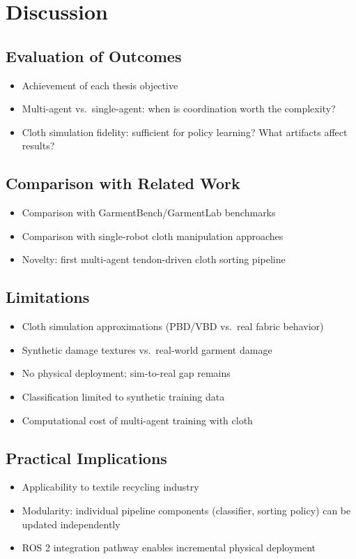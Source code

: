 \chapter{Discussion}\label{ch:discussion}

\section{Evaluation of Outcomes}
\begin{itemize}
    \item Achievement of each thesis objective
    \item Multi-agent vs.\ single-agent: when is coordination worth the complexity?
    \item Cloth simulation fidelity: sufficient for policy learning? What artifacts affect results?
\end{itemize}

\section{Comparison with Related Work}
\begin{itemize}
    \item Comparison with GarmentBench/GarmentLab benchmarks
    \item Comparison with single-robot cloth manipulation approaches
    \item Novelty: first multi-agent tendon-driven cloth sorting pipeline
\end{itemize}

\section{Limitations}
\begin{itemize}
    \item Cloth simulation approximations (PBD/VBD vs.\ real fabric behavior)
    \item Synthetic damage textures vs.\ real-world garment damage
    \item No physical deployment; sim-to-real gap remains
    \item Classification limited to synthetic training data
    \item Computational cost of multi-agent training with cloth
\end{itemize}

\section{Practical Implications}
\begin{itemize}
    \item Applicability to textile recycling industry
    \item Modularity: individual pipeline components (classifier, sorting policy) can be updated independently
    \item ROS 2 integration pathway enables incremental physical deployment
\end{itemize}

